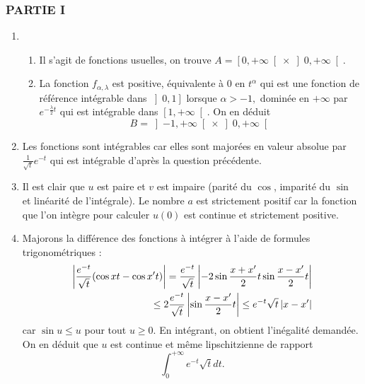 \subsubsection*{PARTIE I}

\begin{enumerate}
\item
\begin{enumerate}
\item  Il s'agit de fonctions usuelles, on trouve $A=\left[ 0,+\infty
\right[ \times \left] 0,+\infty \right[ $.

\item  La fonction $f_{\alpha ,\lambda }$ est positive, {\'e}quivalente
{\`a} $0$ en $t^{\alpha }$ qui est une fonction de r{\'e}f{\'e}rence
int{\'e}grable dans $\left] 0,1\right] $ lorsque $\alpha >-1,$ domin{\'e}e
en $+\infty $ par $e^{-\frac{\lambda }{2}t}$ qui est int{\'e}grable dans $%
\left[ 1,+\infty \right[ $. On en d{\'e}duit
\[
B=\left] -1,+\infty \right[ \times \left] 0,+\infty \right[
\]
\end{enumerate}

\item  Les fonctions sont int{\'e}grables car elles sont major{\'e}es en
valeur absolue par $\frac{1}{\sqrt{t}}e^{-t}$ qui est int{\'e}grable
d'apr{\`e}s la question pr{\'e}c{\'e}dente.

\item  Il est clair que $u$ est paire et $v$ est impaire (parit{\'e} du $%
\cos $, imparit{\'e} du $\sin $ et lin{\'e}arit{\'e} de l'int{\'e}grale). Le
nombre $a$ est strictement positif car la fonction que l'on
int{\`e}gre pour calculer $u(0)$ est continue et strictement positive.

\item  Majorons la diff{\'e}rence des fonctions {\`a} int{\'e}grer {\`a}
l'aide de formules trigonom{\'e}triques :
\begin{eqnarray*}
\left| \frac{e^{-t}}{\sqrt{t}}(\cos xt-\cos x^{\prime }t)\right| =\frac{%
e^{-t}}{\sqrt{t}}\left| -2\sin \frac{x+x^{\prime }}{2}t\sin \frac{%
x-x^{\prime }}{2}t\right|\\
 \leq 2\frac{e^{-t}}{\sqrt{t}}\left| \sin \frac{%
x-x^{\prime }}{2}t\right| \leq e^{-t}\sqrt{t}\left| x-x^{\prime
}\right|
\end{eqnarray*}
car $\sin u\leq u$ pour tout $u\geq 0$. En int{\'e}grant, on obtient
l'in{\'e}galit{\'e} demand{\'e}e. On en d{\'e}duit que $u$ est continue et m{\^e}me
lipschitzienne de rapport
\[\int_{0}^{+\infty }e^{-t}\sqrt{t}dt.\]
\end{enumerate}

